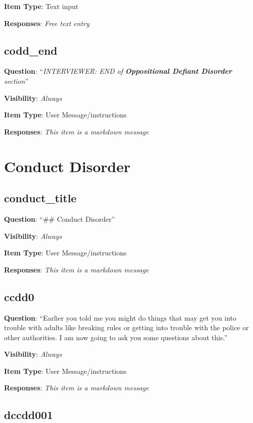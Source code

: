 \documentclass[]{book}
\begin{document}
\textbf{Item Type}: Text input

\textbf{Responses}: \emph{Free text entry}

\hypertarget{codd_end}{%
\section{codd\_end}\label{codd_end}}

\textbf{Question}: ``\emph{INTERVIEWER: END of \textbf{Oppositional Defiant Disorder} section}''

\textbf{Visibility}: \emph{Always}

\textbf{Item Type}: User Message/instructions

\textbf{Responses}: \emph{This item is a markdown message}

\hypertarget{conduct_disorder_section}{%
\chapter{Conduct Disorder}\label{conduct_disorder_section}}

\hypertarget{conduct_title}{%
\section{conduct\_title}\label{conduct_title}}

\textbf{Question}: ``\#\# Conduct Disorder''

\textbf{Visibility}: \emph{Always}

\textbf{Item Type}: User Message/instructions

\textbf{Responses}: \emph{This item is a markdown message}

\hypertarget{ccdd0}{%
\section{ccdd0}\label{ccdd0}}

\textbf{Question}: ``Earlier you told me you might do things that may get you into trouble with adults like breaking rules or getting into trouble with the police or other authorities. I am now going to ask you some questions about this.''

\textbf{Visibility}: \emph{Always}

\textbf{Item Type}: User Message/instructions

\textbf{Responses}: \emph{This item is a markdown message}

\hypertarget{dccdd001}{%
\section{dccdd001}\label{dccdd001}}
\end{document}
